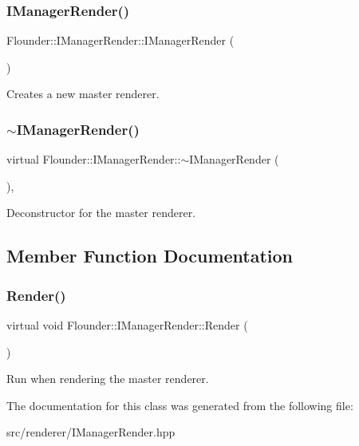 \subsubsection{\texorpdfstring{I\+Manager\+Render()}{IManagerRender()}}
{\footnotesize\ttfamily Flounder\+::\+I\+Manager\+Render\+::\+I\+Manager\+Render (\begin{DoxyParamCaption}{ }\end{DoxyParamCaption})\hspace{0.3cm}{\ttfamily [inline]}}



Creates a new master renderer. 

\mbox{\label{class_flounder_1_1_i_manager_render_a30ea24933c1c02eb7dee1703ea37b9e3}} 
\subsubsection{\texorpdfstring{$\sim$\+I\+Manager\+Render()}{~IManagerRender()}}
{\footnotesize\ttfamily virtual Flounder\+::\+I\+Manager\+Render\+::$\sim$\+I\+Manager\+Render (\begin{DoxyParamCaption}{ }\end{DoxyParamCaption})\hspace{0.3cm}{\ttfamily [inline]}, {\ttfamily [virtual]}}



Deconstructor for the master renderer. 



\subsection{Member Function Documentation}
\mbox{\label{class_flounder_1_1_i_manager_render_a7c4c2209e25c292b94b59f94a1c35a53}} 
\subsubsection{\texorpdfstring{Render()}{Render()}}
{\footnotesize\ttfamily virtual void Flounder\+::\+I\+Manager\+Render\+::\+Render (\begin{DoxyParamCaption}{ }\end{DoxyParamCaption})\hspace{0.3cm}{\ttfamily [pure virtual]}}



Run when rendering the master renderer. 



The documentation for this class was generated from the following file\+:\begin{DoxyCompactItemize}
\item 
src/renderer/I\+Manager\+Render.\+hpp\end{DoxyCompactItemize}
